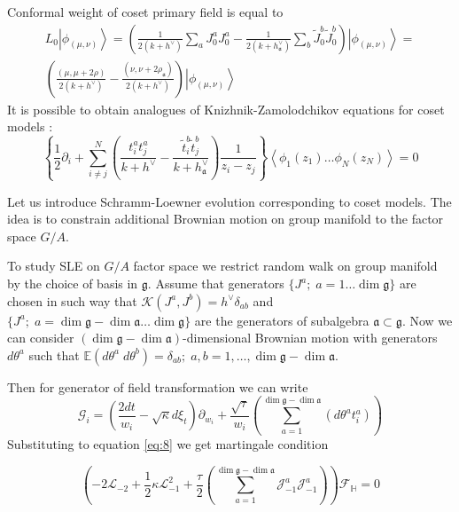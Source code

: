 \documentclass[a4paper]{article}
\theoremstyle{definition}
\newcommand{\gf}{\mathfrak{g}}
\newcommand{\af}{\mathfrak{a}}
\theoremstyle{definition} \newtheorem{Def}{Definition}
\begin{document}
Conformal weight of coset primary field is equal to
\begin{multline}
L_0\left|\phi_{(\mu,\nu)}\right>=\left(\frac{1}{2(k+h^{\vee})}\sum_aJ^a_0J^a_0-\frac{1}{2(k+h_{\af}^{\vee})}\sum_b
\tilde{J}^b_0 \tilde{J}^b_0 \right) \left|\phi_{(\mu,\nu)}\right>=\\
\left(\frac{(\mu,\mu+2\rho)}{2(k+h^{\vee})}-\frac{(\nu,\nu+2\rho_{\af})}{2(k+h^{\vee})}\right)\left|\phi_{(\mu,\nu)}\right>
\end{multline} It is possible to obtain analogues of Knizhnik-Zamolodchikov equations for coset
models \cite{kogan1997knizhnik}:
\begin{equation} \left\{\frac{1}{2}\partial_{i} + \sum_{i\neq
j}^{N}\left(\frac{t^{a}_{i}t^{a}_{j}}{k+h^{\vee}}-\frac{\tilde t^{b}_{i}\tilde
t^{b}_{j}}{k+h^{\vee}_{\af}}\right)\frac{1}{z_{i}-z_{j}}\right\} \left<\phi_{1}(z_{1})\dots
\phi_{N}(z_{N})\right>=0
  \label{eq:6}
\end{equation}

Let us introduce Schramm-Loewner evolution corresponding to coset models. The idea is to constrain
additional Brownian motion on group manifold to the factor space $G/A$.


To study SLE on $G/A$ factor space we restrict random walk on group manifold by the choice of basis
in $\gf$. Assume that generators $\{J^{a};\; a=1\dots \dim\gf\}$ are chosen in such way that
$\mathcal{K}(J^{a},J^{b})=h^{\vee}\delta_{ab}$ and $\{J^{a};\;
a=\dim\gf-\dim\af\dots \dim\gf\}$ are the generators of subalgebra
$\af\subset \gf$. Now we can consider $(\dim\gf-\dim\af)$-dimensional Brownian
motion with generators $d\theta^{a}$ such that $\mathbb{E}(d\theta^{a} \;
d\theta^{b})=\delta_{ab};\; a,b=1,\dots,\dim\gf-\dim\af$.

Then for generator of field transformation we can write
\begin{equation} \mathcal{G}_{i}=\left(\frac{2dt}{w_{i}}-\sqrt{\kappa}
d\xi_{t}\right) \partial_{w_{i}}+\frac{\sqrt{\tau}}{w_{i}}\left(\sum_{a=1}^{\dim\gf-\dim\af}\left(d
\theta ^{a} t^{a}_{i}\right)\right)
\label{eq:5}
\end{equation}
 Substituting to equation \eqref{eq:8} we get martingale condition

\begin{equation} \left(-2 \mathcal{L}_{-2}+\frac{1}{2}\kappa
\mathcal{L}_{-1}^{2}+\frac{\tau}{2}\left( \sum_{a=1}^{\dim\gf-\dim\af}
\mathcal{J}^{a}_{-1} \mathcal{J}^{a}_{-1}\right)\right) \mathcal{F}_{\mathbb{H}}=0
\label{eq:9}
\end{equation}
\end{document}
